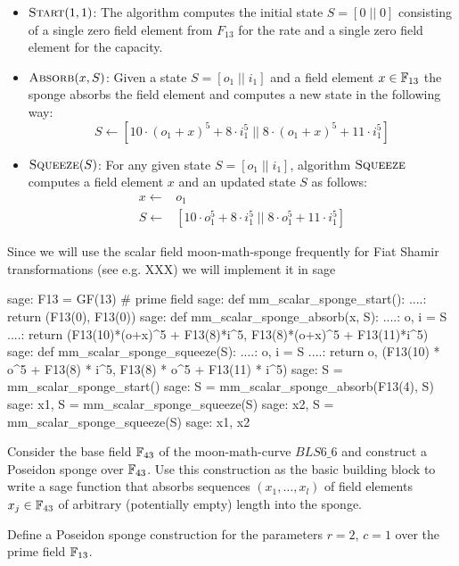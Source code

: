 \begin{itemize}
\item $\textsc{Start}(1,1)$: The algorithm computes the initial state $S=[0\;||\;0]$  consisting of a single zero field element from $F_{13}$ for the rate and a single zero field element for the capacity.
\item $\textsc{Absorb}(x,S)$: Given a state $S=[o_1\;||\;i_1]$ and a field element $x\in \mathbb{F}_{13}$ the sponge absorbs the field element and computes a new state in the following way:
$$
S \leftarrow [10\cdot (o_1+x)^5 + 8\cdot i_1^5 \;||\; 8\cdot (o_1+x)^5 + 11\cdot i_1^5]
$$
\item $\textsc{Squeeze}(S)$: For any given state $S=[o_1\;||\;i_1]$, algorithm $\textsc{Squeeze}$ computes a field element $x$ and an updated state $S$ as follows:
\begin{align*}
x \leftarrow & o_1 \\
S \leftarrow & [10\cdot o_1^5 + 8\cdot i_1^5 \;||\; 8\cdot o_1^5 + 11\cdot i_1^5]
\end{align*} 
\end{itemize}
Since we will use the scalar field moon-math-sponge frequently for Fiat Shamir transformations (see e.g. XXX) we will implement it in sage
\begin{sagecommandline}
sage: F13 = GF(13) # prime field
sage: def mm_scalar_sponge_start():
....:     return (F13(0), F13(0))
sage: def mm_scalar_sponge_absorb(x, S):
....:     o, i = S
....:     return (F13(10)*(o+x)^5 + F13(8)*i^5, F13(8)*(o+x)^5 + F13(11)*i^5)
sage: def mm_scalar_sponge_squeeze(S):
....:     o, i = S
....:     return o, (F13(10) * o^5 + F13(8) * i^5, F13(8) * o^5 + F13(11) * i^5)
sage: S = mm_scalar_sponge_start()
sage: S = mm_scalar_sponge_absorb(F13(4), S)
sage: x1, S = mm_scalar_sponge_squeeze(S)
sage: x2, S = mm_scalar_sponge_squeeze(S)
sage: x1, x2
\end{sagecommandline}
\begin{exercise}
Consider the base field $\mathbb{F}_{43}$ of the moon-math-curve $BLS6\_6$ and construct a Poseidon sponge over $\mathbb{F}_{43}$. Use this construction as the basic building block to write a sage function that absorbs sequences $(x_1,\ldots,x_l)$ of field elements $x_j\in \mathbb{F}_{43}$ of arbitrary (potentially empty) length into the sponge.
\end{exercise}
\begin{exercise}\label{exercise-wider-f13-sponge}
Define a Poseidon sponge construction for the parameters $r=2$, $c=1$ over the prime field $\mathbb{F}_{13}$.
\end{exercise}

